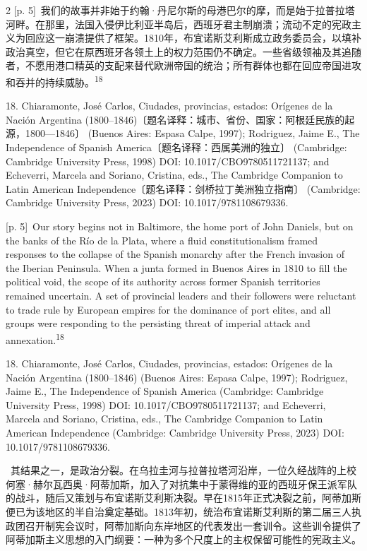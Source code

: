 \documentclass[10pt,a4paper]{article}
\begin{document}
\begin{paracol}{2}
{\scriptsize\color{gray} [p. 5]}\ 我们的故事并非始于约翰·丹尼尔斯的母港巴尔的摩，而是始于拉普拉塔河畔。在那里，法国入侵伊比利亚半岛后，西班牙君主制崩溃；流动不定的宪政主义为回应这一崩溃提供了框架。1810年，布宜诺斯艾利斯成立政务委员会，以填补政治真空，但它在原西班牙各领土上的权力范围仍不确定。一些省级领袖及其追随者，不愿用港口精英的支配来替代欧洲帝国的统治；所有群体也都在回应帝国进攻和吞并的持续威\mbox{胁。\textsuperscript{18}}\par{\small 18. Chiaramonte, José Carlos, Ciudades, provincias, estados: Orígenes de la Nación Argentina (1800–1846)〔题名译释：城市、省份、国家：阿根廷民族的起源，1800—1846〕 (Buenos Aires: Espasa Calpe, 1997); Rodriguez, Jaime E., The Independence of Spanish America〔题名译释：西属美洲的独立〕 (Cambridge: Cambridge University Press, 1998) DOI: 10.1017/CBO9780511721137; and Echeverri, Marcela and Soriano, Cristina, eds., The Cambridge Companion to Latin American Independence〔题名译释：剑桥拉丁美洲独立指南〕 (Cambridge: Cambridge University Press, 2023) DOI: 10.1017/9781108679336.\par}
\switchcolumn
{\scriptsize\color{gray} [p. 5]}\ Our story begins not in Baltimore, the home port of John Daniels, but on the banks of the Río de la Plata, where a fluid constitutionalism framed responses to the collapse of the Spanish monarchy after the French invasion of the Iberian Peninsula. When a junta formed in Buenos Aires in 1810 to fill the political void, the scope of its authority across former Spanish territories remained uncertain. A set of provincial leaders and their followers were reluctant to trade rule by European empires for the dominance of port elites, and all groups were responding to the persisting threat of imperial attack and annexation.\nobreak\textsuperscript{18}\par{\small 18. Chiaramonte, José Carlos, Ciudades, provincias, estados: Orígenes de la Nación Argentina (1800–1846) (Buenos Aires: Espasa Calpe, 1997); Rodriguez, Jaime E., The Independence of Spanish America (Cambridge: Cambridge University Press, 1998) DOI: 10.1017/CBO9780511721137; and Echeverri, Marcela and Soriano, Cristina, eds., The Cambridge Companion to Latin American Independence (Cambridge: Cambridge University Press, 2023) DOI: 10.1017/9781108679336.\par}
\switchcolumn*
{\scriptsize\color{gray} [p. 6]}\ 其结果之一，是政治分裂。在乌拉圭河与拉普拉塔河沿岸，一位久经战阵的上校何塞·赫尔瓦西奥·阿蒂加斯，加入了对抗集中于蒙得维的亚的西班牙保王派军队的战斗，随后又策划与布宜诺斯艾利斯决裂。早在1815年正式决裂之前，阿蒂加斯便已为该地区的半自治奠定基础。1813年初，统治布宜诺斯艾利斯的第二届三人执政团召开制宪会议时，阿蒂加斯向东岸地区的代表发出一套训令。这些训令提供了阿蒂加斯主义思想的入门纲要：一种为多个尺度上的主权保留可能性的宪政主义。\par

\end{paracol}
\end{document}
